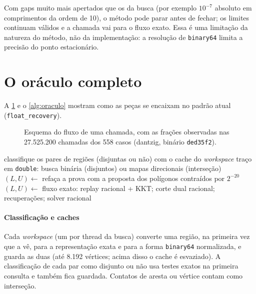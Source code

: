 \documentclass[11pt,a4paper]{article}
\theoremstyle{plain}\newtheorem{proposicao}{Proposição}
\theoremstyle{definition}\newtheorem{definicao}{Definição}
\theoremstyle{plain}\newtheorem{teorema}{Teorema}
\newcommand{\code}[1]{\texttt{\small #1}}
\begin{document}
Com gaps muito mais apertados que os da busca (por exemplo \(10^{-7}\) absoluto em comprimentos da ordem de 10), o método pode parar antes de fechar; os limites continuam válidos e a chamada vai para o fluxo exato. Essa é uma limitação da natureza do método, não da implementação: a resolução de \texttt{binary64} limita a precisão do ponto estacionário.

\section{O oráculo completo}\label{sec:oraculo}
A \cref{fig:fluxo} e o \cref{alg:oraculo} mostram como as peças se encaixam no padrão atual (\code{float\_recovery}).

\begin{figure}[ht]\centering\figfluxo
\caption{Esquema do fluxo de uma chamada, com as frações observadas nas 27.525.200 chamadas dos 558 casos (dantzig, binário \code{ded35f2}).}\label{fig:fluxo}
\end{figure}

\begin{algorithm}[ht]\small
\caption{Oráculo de ordem fixa no padrão atual (\code{tpp\_convex\_solve\_certified}).}\label{alg:oraculo}
\begin{algorithmic}[1]
  \State classifique os pares de regiões (disjuntas ou não) com o cache do \emph{workspace}
  \State traço em \texttt{double}: busca binária (disjuntos) ou mapas direcionais (interseção)
  \State $(L,U)\gets$ 
    \State refaça a prova com a proposta dos polígonos contraídos por $2^{-20}$
  \EndIf
  \State $(L,U)\gets$ 
  \State \Return fluxo exato: replay racional + KKT; corte dual racional; recuperações; solver racional
\EndFunction
\end{algorithmic}
\end{algorithm}

\paragraph{Classificação e caches} Cada \emph{workspace} (um por thread da busca) converte uma região, na primeira vez que a vê, para a representação exata e para a forma \texttt{binary64} normalizada, e guarda as duas (até 8.192 vértices; acima disso o cache é esvaziado). A classificação de cada par como disjunto ou não usa testes exatos na primeira consulta e também fica guardada. Contatos de aresta ou vértice contam como interseção.
\end{document}
